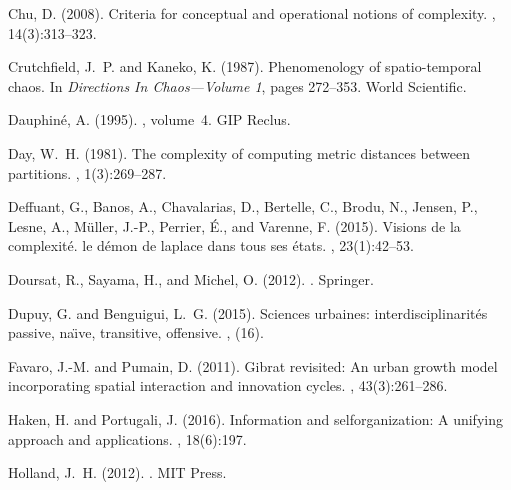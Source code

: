 \documentclass[11pt]{article}
\begin{document}
\begin{thebibliography}{}
Chu, D. (2008).
\newblock Criteria for conceptual and operational notions of complexity.
, 14(3):313--323.

Crutchfield, J.~P. and Kaneko, K. (1987).
\newblock Phenomenology of spatio-temporal chaos.
\newblock In {\em Directions In Chaos---Volume 1}, pages 272--353. World
  Scientific.

Dauphin{\'e}, A. (1995).
, volume~4.
\newblock GIP Reclus.

Day, W.~H. (1981).
\newblock The complexity of computing metric distances between partitions.
, 1(3):269--287.

Deffuant, G., Banos, A., Chavalarias, D., Bertelle, C., Brodu, N., Jensen, P.,
  Lesne, A., M{\"u}ller, J.-P., Perrier, {\'E}., and Varenne, F. (2015).
\newblock Visions de la complexit{\'e}. le d{\'e}mon de laplace dans tous ses
  {\'e}tats.
, 23(1):42--53.

Doursat, R., Sayama, H., and Michel, O. (2012).
.
\newblock Springer.

Dupuy, G. and Benguigui, L.~G. (2015).
\newblock Sciences urbaines: interdisciplinarit{\'e}s passive, na{\"\i}ve,
  transitive, offensive.
, (16).

Favaro, J.-M. and Pumain, D. (2011).
\newblock Gibrat revisited: An urban growth model incorporating spatial
  interaction and innovation cycles.
, 43(3):261--286.

Haken, H. and Portugali, J. (2016).
\newblock Information and selforganization: A unifying approach and
  applications.
, 18(6):197.

Holland, J.~H. (2012).
.
\newblock MIT Press.


\end{thebibliography}
\end{document}
